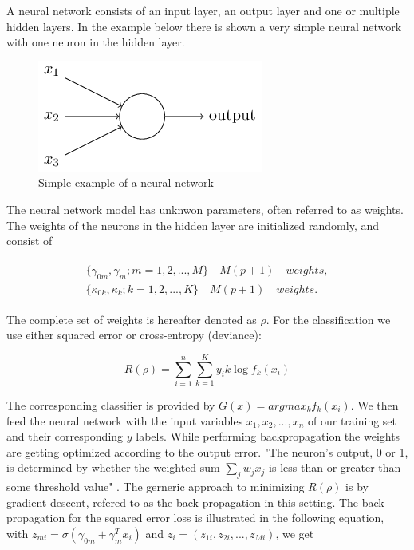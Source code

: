 \documentclass[12pt]{article}
\begin{document}
A neural network consists of an input layer, an output layer and one or multiple hidden layers. In the example below there is shown a very simple neural network with one neuron in the hidden layer.

\begin{figure}[H]
	\begin{center}
     	\includegraphics[scale = 0.6]{nn_simple_example.png}
     \end{center}
      \caption{Simple example of a neural network}
           \label{fig:q1}
\end{figure}

\noindent The neural network model has unknwon parameters, often referred to as weights. The weights of the neurons in the hidden layer are initialized randomly, and consist of

\begin{align}
\begin{split}
 \{\gamma_{0m},\gamma_{m}; m=1,2,...,M\} \quad M(p+1)\quad weights,
\\
 \{\kappa_{0k},\kappa_{k}; k=1,2,...,K\} \quad M(p+1)\quad weights.
\end{split}
\end{align}

The complete set of weights is hereafter denoted as $\rho$. For the classification we use either squared error or cross-entropy (deviance):

\begin{center}
	\begin{equation}
  R(\rho)=\sum_{i=1}^n\sum_{k=1}^Ky_ik \log f_k(x_i)
	\end{equation}
\end{center}

The corresponding classifier is provided by \(G(x) = argmax_kf_k(x_i)\). We then feed the neural network with the input variables $x_1, x_2, ...,x_n$ of our training set and their corresponding $y$ labels. While performing backpropagation the weights are getting optimized according to the output error. "The neuron's output, 0 or 1, is determined by whether the weighted sum $\sum_{j}w_jx_j$ is less than or greater than some threshold value" \cite{nielsen2015neural}. The gerneric approach to minimizing \(R(\rho)\) is by gradient descent, refered to as the back-propagation in this setting. The back-propagation for the squared error loss is illustrated in the following equation, with \(z_{mi}=\sigma(\gamma_{0m}+\gamma_m^Tx_i)\) and \(z_i=(z_{1i}, z_{2i},...,z_{Mi})\), we get
	
\end{document}
